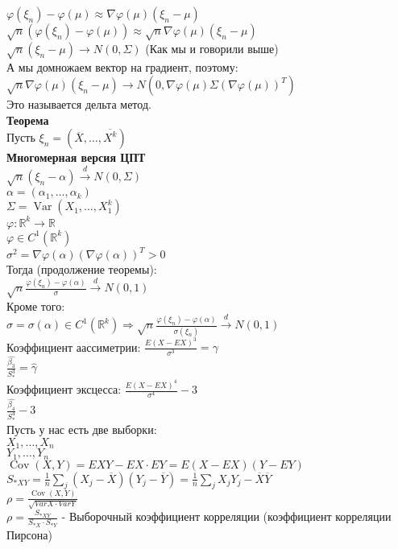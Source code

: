 \documentclass{article}
\newcommand\0{\mathbb{0}}
\DeclareMathOperator{\Var}{Var}
\DeclareMathOperator{\Cov}{Cov}
\newcommand\1{\mathbb{1}}
\begin{document}
    $\varphi(\xi_n) - \varphi(\mu) \approx \nabla \varphi(\mu)(\xi_n - \mu)$\\
    $\sqrt{n} (\varphi(\xi_n) - \varphi(\mu)) \approx \sqrt{n}\nabla \varphi(\mu)(\xi_n - \mu)$\\
    $\sqrt{n} (\xi_n - \mu) \to N(0, \Sigma)$ (Как мы и говорили выше)\\
    А мы домножаем вектор на градиент, поэтому:\\
    $\sqrt{n} \nabla \varphi(\mu) (\xi_n - \mu) \to N(0, \nabla \varphi(\mu) \Sigma (\nabla \varphi(\mu))^T)$\\
Это называется дельта метод.\\
\textbf{Теорема}\\
Пусть $\xi_n = (\overline{X},\dots, \overline{X^k})$\\
\textbf{Многомерная версия ЦПТ}\\
$\sqrt{n}(\xi_n - \alpha) \xrightarrow[]{d} N(0, \Sigma)$\\
$\alpha = (\alpha_1,\dots,\alpha_k)$\\
$\Sigma = \Var(X_1, \dots, X_1^k)$\\
$\varphi: \mathbb{R}^k \to \mathbb{R}$\\
$\varphi \in C^1(\mathbb{R}^k)$\\
$\sigma^2 = \nabla \varphi(\alpha) (\nabla \varphi(\alpha))^T > 0$\\
Тогда (продолжение теоремы):\\
$\sqrt{n}\frac{\varphi(\xi_n) - \varphi(\alpha)}{\sigma} \xrightarrow[]{d} N(0,1)$\\
Кроме того:\\
$\sigma = \sigma(\alpha) \in C^1(\mathbb{R}^k) \Rightarrow \sqrt{n} \frac{\varphi(\xi_n) - \varphi(\alpha)}{\sigma(\xi_n)} \xrightarrow[]{d} N(0,1)$\\
Коэффициент аассиметрии: $\frac{E(X - EX)^3}{\sigma^3} = \gamma$\\
$\frac{\widehat{\beta_3}}{S_*^3} = \widehat{\gamma}$\\
Коэффициент эксцесса: $\frac{E(X - EX)^4}{\sigma^4} - 3$\\
$\frac{\widehat{\beta_4}}{S_*^4} - 3$\\
Пусть у нас есть две выборки:\\
$X_1,\dots,X_n$\\
$Y_1,\dots,Y_n$\\
$\Cov(X,Y) = EXY - EX \cdot EY = E(X - EX)(Y - EY)$\\
$S_{*XY} = \frac{1}{n}\displaystyle\sum_j(X_j - \overline{X})(Y_j - \overline{Y}) = \frac{1}{n}\displaystyle\sum_j X_jY_j - \overline{X} \overline{Y}$\\
$\rho = \frac{\Cov(X,Y)}{\sqrt{VarX \cdot VarY}}$\\
$\rho = \frac{S_{*XY}}{S_{*X} \cdot S_{*Y}}$ - Выборочный коэффициент корреляции (коэффициент корреляции Пирсона)\\
\end{document}
